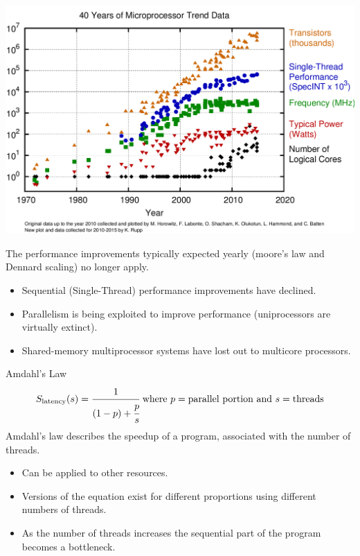 \begin{center}
    \includegraphics[width=.9\textwidth]{introduction/images/moores_law_graph.png}
\end{center}
The performance improvements typically expected yearly (moore's law and Dennard scaling) no longer apply.
\begin{itemize}
    \item Sequential (Single-Thread) performance improvements have declined.
    \item Parallelism is being exploited to improve performance (uniprocessors are virtually extinct).
    \item Shared-memory multiprocessor systems have lost out to multicore processors.
\end{itemize} 

\begin{definitionbox}{Amdahl's Law}
    \[S_{\text{latency}}(s) = \cfrac{1}{(1-p)+ \cfrac{p}{s}} \text{ where } p = \text{parallel portion} \text{ and } s = \text{threads}\]
    Amdahl's law describes the speedup of a program, associated with the number of threads.
    \begin{itemize}
        \item Can be applied to other resources.
        \item Versions of the equation exist for different proportions using different numbers of threads.
        \item As the number of threads increases the sequential part of the program becomes a bottleneck. 
    \end{itemize}
\end{definitionbox}

